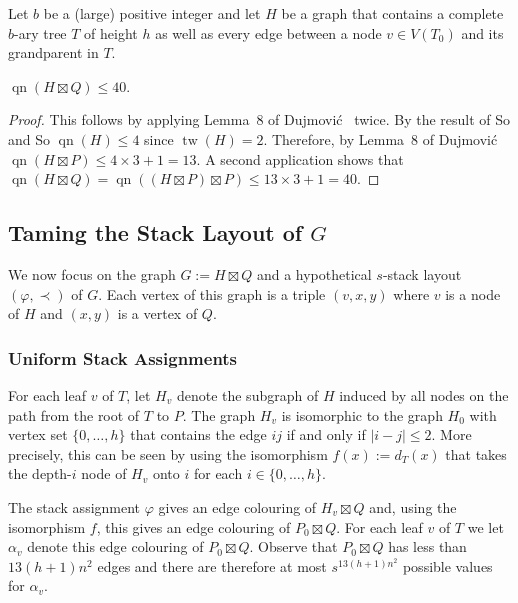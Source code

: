 \documentclass[kpfonts]{patmorin}
\DeclareMathOperator{\qn}{qn}
\DeclareMathOperator{\tw}{tw}
\begin{document}
Let $b$ be a (large) positive integer and let $H$ be a graph that contains a complete $b$-ary tree $T$ of height $h$ as well as every edge between a node $v\in V(T_0)$ and its grandparent in $T$.




\begin{lem}
    $\qn(H\boxtimes Q) \le 40$.
\end{lem}

\begin{proof}
    This follows by applying Lemma~8 of Dujmović \etal\ twice.  By the result of So and So $\qn(H)\le 4$ since $\tw(H)=2$.  Therefore, by Lemma~8 of Dujmović \etal\ $\qn(H\boxtimes P)\le 4\times 3+1= 13$.  A second application shows that $\qn(H\boxtimes Q)=\qn((H\boxtimes P)\boxtimes P)\le 13\times 3 + 1=40$.
\end{proof}

\subsection{Taming the Stack Layout of $G$}

We now focus on the graph $G:=H\boxtimes Q$ and a hypothetical $s$-stack layout $(\varphi,\prec)$ of $G$.  Each vertex of this graph is a triple $(v,x,y)$ where $v$ is a node of $H$ and $(x,y)$ is a vertex of $Q$.

\subsubsection{Uniform Stack Assignments}
For each leaf $v$ of $T$, let $H_v$ denote the subgraph of $H$ induced by all nodes on the path from the root of $T$ to $P$.  The graph $H_v$ is isomorphic to the graph $H_0$ with vertex set $\{0,\ldots,h\}$ that contains the edge $ij$ if and only if $|i-j|\le 2$.  More precisely, this can be seen by using the isomorphism $f(x):=d_T(x)$ that takes the depth-$i$ node of $H_v$ onto $i$ for each $i\in\{0,\ldots,h\}$.

The stack assignment $\varphi$ gives an edge colouring of $H_v\boxtimes Q$ and, using the isomorphism $f$, this gives an edge colouring of $P_0\boxtimes Q$.  For each leaf $v$ of $T$ we let $\alpha_v$ denote this edge colouring of $P_0\boxtimes Q$.  Observe that $P_0\boxtimes Q$ has less than $13(h+1)n^2$ edges and there are therefore at most $s^{13(h+1)n^2}$ possible values for $\alpha_v$.
\end{document}
